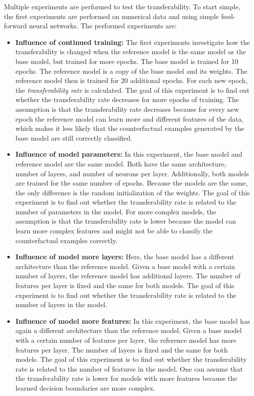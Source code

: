 \documentclass{article}
\begin{document}
Multiple experiments are performed to test the transferability. To start simple, the first experiments are performed on numerical data and using simple feed-forward neural networks. The performed experiments are:
\begin{itemize}
    \item \textbf{Influence of continued training:} The first experiments investigate how the transferability is changed when the reference model is the same model as the base model, but trained for more epochs. The base model is trained for 10 epochs. The reference model is a copy of the base model and its weights. The reference model then is trained for 20 additional epochs. For each new epoch, the \textit{transferability rate} is calculated. The goal of this experiment is to find out whether the transferability rate decreases for more epochs of training. The assumption is that the transferability rate decreases because for every new epoch the reference model can learn more and different features of the data, which makes it less likely that the counterfactual examples generated by the base model are still correctly classified.
    \item \textbf{Influence of model parameters:} In this experiment, the base model and reference model are the same model. Both have the same architecture, number of layers, and number of neurons per layer. Additionally, both models are trained for the same number of epochs. Because the models are the same, the only difference is the random initialization of the weights. The goal of this experiment is to find out whether the transferability rate is related to the number of parameters in the model. For more complex models, the assumption is that the transferability rate is lower because the model can learn more complex features and might not be able to classify the counterfactual examples correctly. 
    \item \textbf{Influence of model more layers:} Here, the base model has a different architecture than the reference model. Given a base model with a certain number of layers, the reference model has additional layers. The number of features per layer is fixed and the same for both models. The goal of this experiment is to find out whether the transferability rate is related to the number of layers in the model. 
    \item \textbf{Influence of model more features:} In this experiment, the base model has again a different architecture than the reference model. Given a base model with a certain number of features per layer, the reference model has more features per layer. The number of layers is fixed and the same for both models. The goal of this experiment is to find out whether the transferability rate is related to the number of features in the model. One can assume that the transferability rate is lower for models with more features because the learned decision boundaries are more complex.
\end{itemize}
\end{document}
